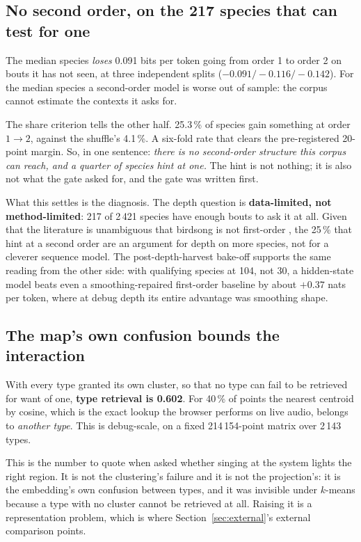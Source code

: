 \documentclass[10pt,twocolumn,a4paper]{article}
\begin{document}
\subsection{No second order, on the 217 species that can test for one}

The median species \emph{loses} 0.091 bits per token going from order 1 to order 2 on bouts
it has not seen, at three independent splits ($-0.091 / -0.116 / -0.142$). For the median
species a second-order model is worse out of sample: the corpus cannot estimate the contexts
it asks for.

The share criterion tells the other half. 25.3\,\% of species gain something at order
$1 \to 2$, against the shuffle's 4.1\,\%. A six-fold rate that clears the pre-registered
20-point margin. So, in one sentence: \emph{there is no second-order structure
this corpus can reach, and a quarter of species hint at one.} The hint is not nothing; it
is also not what the gate asked for, and the gate was written first.

What this settles is the diagnosis. The depth question is \textbf{data-limited, not
method-limited}: 217 of 2\,421 species have enough bouts to ask it at all. Given that the
literature is unambiguous that birdsong is not first-order \citep{jin2011,lu2025}, the 25\,\%
that hint at a second order are an argument for depth on more species, not for a
cleverer sequence model. The post-depth-harvest bake-off supports the same reading from the
other side: with qualifying species at 104, not 30, a hidden-state model beats even a
smoothing-repaired first-order baseline by about $+0.37$ nats per token, where at debug depth
its entire advantage was smoothing shape.

\subsection{The map's own confusion bounds the interaction}

With every type granted its own cluster, so that no type can fail to be retrieved for want
of one, \textbf{type retrieval is 0.602}. For 40\,\% of points the nearest centroid by cosine, which is the exact lookup the
browser performs on live audio, belongs to \emph{another type}.
This is debug-scale, on a fixed 214\,154-point matrix over 2\,143 types.

This is the number to quote when asked whether singing at the system lights the right region.
It is not the clustering's failure and it is not the projection's: it is the embedding's own
confusion between types, and it was invisible under $k$-means because a type with no cluster
cannot be retrieved at all. Raising it is a representation problem, which is where
Section~\ref{sec:external}'s external comparison points.
\end{document}
